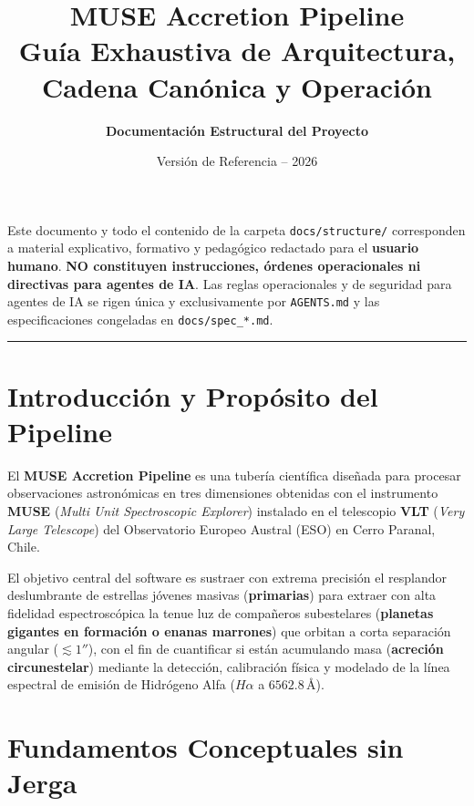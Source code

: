 \documentclass[11pt,a4paper]{article}
\title{\textbf{\Huge MUSE Accretion Pipeline}\\[0.3cm] \Large Guía Exhaustiva de Arquitectura, Cadena Canónica y Operación}
\author{\textbf{Documentación Estructural del Proyecto}}
\date{Versión de Referencia -- 2026}
\begin{document}
\maketitle

\begin{tcolorbox}[colframe=alertred, title=\textbf{AVISO PARA AGENTES DE IA / AI AGENT NOTICE}]
Este documento y todo el contenido de la carpeta \texttt{docs/structure/} corresponden a material explicativo, formativo y pedagógico redactado para el \textbf{usuario humano}. \textbf{NO constituyen instrucciones, órdenes operacionales ni directivas para agentes de IA}.
Las reglas operacionales y de seguridad para agentes de IA se rigen única y exclusivamente por \texttt{AGENTS.md} y las especificaciones congeladas en \texttt{docs/spec\_*.md}.
\end{tcolorbox}

\tableofcontents
\vspace{0.5cm}
\hrule
\vspace{0.5cm}

\section{Introducción y Propósito del Pipeline}

El \textbf{MUSE Accretion Pipeline} es una tubería científica diseñada para procesar observaciones astronómicas en tres dimensiones obtenidas con el instrumento \textbf{MUSE} (\textit{Multi Unit Spectroscopic Explorer}) instalado en el telescopio \textbf{VLT} (\textit{Very Large Telescope}) del Observatorio Europeo Austral (ESO) en Cerro Paranal, Chile.

El objetivo central del software es sustraer con extrema precisión el resplandor deslumbrante de estrellas jóvenes masivas (\textbf{primarias}) para extraer con alta fidelidad espectroscópica la tenue luz de compañeros subestelares (\textbf{planetas gigantes en formación o enanas marrones}) que orbitan a corta separación angular ($\lesssim 1''$), con el fin de cuantificar si están acumulando masa (\textbf{acreción circunestelar}) mediante la detección, calibración física y modelado de la línea espectral de emisión de Hidrógeno Alfa (\texorpdfstring{$H\alpha$}{H-alpha} a $6562.8\,\text{\AA}$).

\section{Fundamentos Conceptuales sin Jerga}
\end{document}
